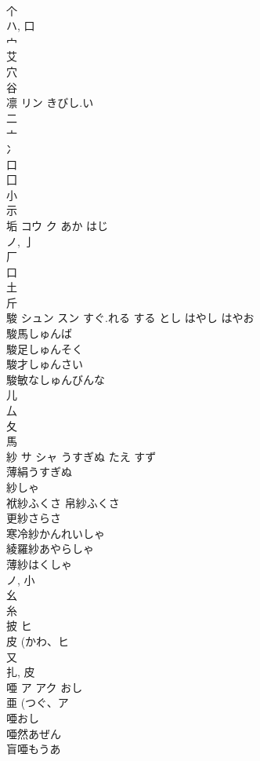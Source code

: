 \documentclass[8pt]{extreport}
\begin{document}
\begin{CJK}{UTF8}{min}
\\	个 
\\	ハ, 口 
\\	宀 
\\	艾 
\\	穴 
\\	谷 
\\	凛	リン	きびし.い	
\\	二 
\\	亠 
\\	冫 
\\	口 
\\	囗 
\\	小 
\\	示 
\\	垢	コウ ク	あか はじ	
\\	ノ, 亅 
\\	厂 
\\	口 
\\	土 
\\	斤 
\\	駿	シュン スン	すぐ.れる する とし はやし はやお	
\\	駿馬しゅんば 
\\	駿足しゅんそく 
\\	駿才しゅんさい 
\\	駿敏なしゅんびんな 
\\	儿 
\\	厶 
\\	夂 
\\	馬 
\\	紗	サ シャ	うすぎぬ たえ すず	
\\	薄絹うすぎぬ 
\\	紗しゃ 
\\	袱紗ふくさ 帛紗ふくさ 
\\	更紗さらさ 
\\	寒冷紗かんれいしゃ 
\\	綾羅紗あやらしゃ 
\\	薄紗はくしゃ 
\\	ノ, 小 
\\	幺 
\\	糸 
\\	披	ヒ		
\\	皮 (かわ、ヒ 
\\	又 
\\	扎, 皮 
\\	唖	ア アク	おし	
\\	亜 (つぐ、ア 
\\	唖おし
\\	唖然あぜん
\\	盲唖もうあ

\end{CJK}
\end{document}
